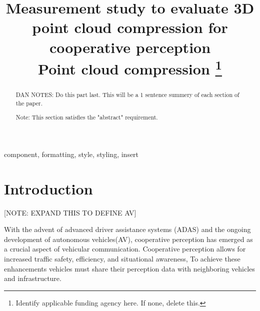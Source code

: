 \documentclass[conference]{IEEEtran}
\begin{document}
\title{Measurement study to evaluate 3D point cloud compression for cooperative perception\\
{\footnotesize Point cloud compression}
\thanks{Identify applicable funding agency here. If none, delete this.}
}

\author{
    \and
}

\maketitle

\begin{abstract}
    DAN NOTES: Do this part last. This will be a 1 sentence summery of each section of the paper.

    Note: This section satisfies the "abstract" requirement.
\end{abstract}

\begin{IEEEkeywords}
    component, formatting, style, styling, insert
\end{IEEEkeywords}

\section{Introduction}
[NOTE: EXPAND THIS TO DEFINE AV]

With the advent of advanced driver assistance systems (ADAS) and the ongoing development of autonomous vehicles(AV), cooperative perception has emerged as a crucial aspect of vehicular communication. Cooperative perception allows for increased traffic safety, efficiency, and situational awareness, To achieve these enhancements vehicles must share their perception data with neighboring vehicles and infrastructure.
\end{document}
